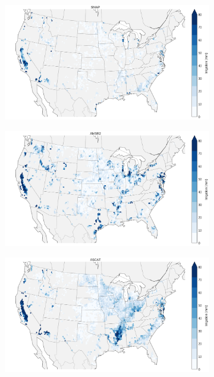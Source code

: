\documentclass[hess, manuscript]{copernicus}
\begin{document}
\clearpage
\begin{figure}
   \centering
   \begin{subfigure}[t]{0.52\textwidth}
       \includegraphics[width=\textwidth]{figures/results/SMAP_multiannual_clim_thresh_0_05_irrig_signals}
       \caption{}
       \label{fig:spatialplot-multiannualirrigation-SMAP}
   \end{subfigure}
   \begin{subfigure}[t]{0.52\textwidth}
       \includegraphics[width=\textwidth]{figures/results/AMSR2_multiannual_clim_thresh_0_05_irrig_signals}
   	   \caption{}
       \label{fig:spatialplot-multiannualirrigation-AMSR2}
   \end{subfigure}
   \begin{subfigure}[t]{0.52\textwidth}
       \includegraphics[width=\textwidth]{figures/results/ASCAT_multiannual_clim_thresh_0_05_irrig_signals}

\end{subfigure}
\end{figure}
\end{document}
